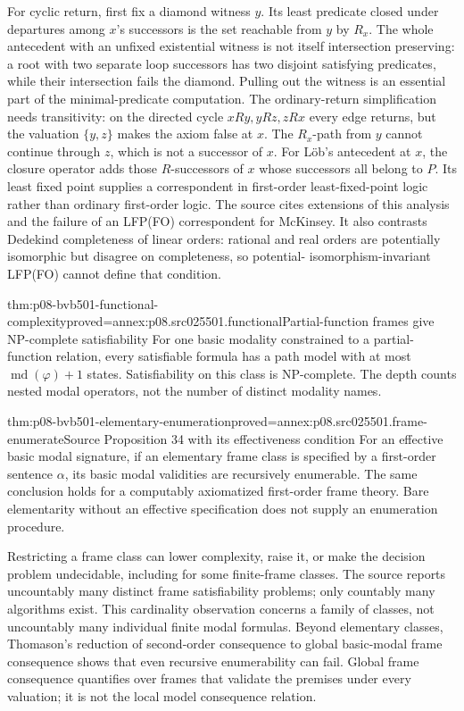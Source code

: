 For cyclic return, first fix a diamond witness \(y\). Its least
predicate closed under departures among \(x\)'s successors is
the set reachable from \(y\) by \(R_x\). The
whole antecedent with an unfixed existential witness is not itself
intersection preserving: a root with two separate loop successors
has two disjoint satisfying predicates, while their intersection fails
the diamond. Pulling out the witness is an essential part of the
minimal-predicate computation. The ordinary-return simplification needs
transitivity: on the directed cycle \(xRy,yRz,zRx\) every edge
returns, but the valuation \(\{y,z\}\) makes the axiom false at
\(x\). The \(R_x\)-path from \(y\) cannot continue through
\(z\), which is not a successor of \(x\). For L\"ob's antecedent at \(x\),
the closure operator adds those \(R\)-successors of \(x\) whose
successors all belong to \(P\). Its least fixed point supplies a
correspondent in first-order least-fixed-point logic rather than ordinary
first-order logic. The source cites extensions of this analysis and
the failure of an LFP(FO) correspondent for McKinsey. It also contrasts
Dedekind completeness of linear orders: rational and real orders are
potentially isomorphic but disagree on completeness, so potential-
isomorphism-invariant LFP(FO) cannot define that condition.

\begin{hbtheorem}{thm:p08-bvb501-functional-complexity}{proved=annex:p08.src025501.functional}{Partial-function frames give NP-complete satisfiability}
For one basic modality constrained to a partial-function relation,
every satisfiable formula has a path model with at most
\(\operatorname{md}(\varphi)+1\) states. Satisfiability on this
class is NP-complete. The depth counts nested modal operators, not the
number of distinct modality names.
\end{hbtheorem}

\begin{hbtheorem}{thm:p08-bvb501-elementary-enumeration}{proved=annex:p08.src025501.frame-enumerate}{Source Proposition 34 with its effectiveness condition}
For an effective basic modal signature, if an elementary frame class is
specified by a first-order sentence
\(\alpha\), its basic modal validities are recursively enumerable.
The same conclusion holds for a computably axiomatized first-order
frame theory. Bare elementarity without an effective specification
does not supply an enumeration procedure.
\end{hbtheorem}

Restricting a frame class can lower complexity, raise it, or make the
decision problem undecidable, including for some finite-frame classes.
The source reports uncountably many distinct frame satisfiability
problems; only countably many algorithms exist. This cardinality
observation concerns a family of classes, not uncountably many individual
finite modal formulas. Beyond elementary classes, Thomason's reduction
of second-order consequence to global basic-modal frame consequence
shows that even recursive enumerability can fail. Global frame
consequence quantifies over frames that validate the premises under
every valuation; it is not the local model consequence relation.

